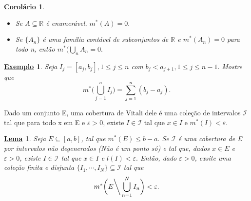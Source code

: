 \documentclass{article}
\newtheorem*{lemma*}{\underline{Lema}}
\newtheorem{example}{\underline{Exemplo}}
\newtheorem*{crl*}{\underline{Corol\'ario}}
\begin{document}
\begin{crl*}
 \begin{itemize}
   \item[1)] Se \(A\subseteq{\mathbb{R}}\) é enumerável, \(m^{*}(A) = 0.\)
     \item[2)] Se \(\{A_{n}\}\) é uma família contável de subconjuntos de \(\mathbb{R}\) e
       \(m^{*}(A_{n}) = 0\) para todo n, então \(m^{*}(\bigcup_{n}^{}A_{n} = 0.\)
 \end{itemize}
\end{crl*}
\begin{example}
  Seja \(I_{j} = [a_{j}, b_{j}], 1\leq j\leq n\) com \(b_{j} < a_{j+1}, 1\leq j\leq n-1.\) Mostre que 
    \[
      m^{*}\biggl(\bigcup_{j=1}^{n}{I_{j}}\biggr) = \sum\limits_{j=1}^{n}(b_{j}-a_{j}).
    \]
\end{example}
  Dado um conjunto E, uma cobertura de Vitali dele é uma cole\c cão de intervalos
  \(\mathcal{I}\) tal que para todo x em E e \(\varepsilon  > 0\), existe \(I\in \mathcal{I}\) tal que
  \(x\in I\) e \(m^{*}(I) < \varepsilon .\) 
\hypertarget{vitali_covering}{
\begin{lemma*}
  Seja \(E\subseteq{[a, b]}\), tal que \(m^{*}(E)\leq b-a.\) Se \(\mathcal{I}\)
  é uma cobertura de E por intervalos não degenerados (Não é um ponto só) e tal que, dados \(x\in E\) e
  \(\varepsilon >0\), existe \(I\in \mathcal{I}\) tal que \(x\in I\) e \(l(I) < \varepsilon .\)
  Então, dado \(\varepsilon  > 0\), exsite uma cole\c cão finita e disjunta \(\{I_{1}, \cdots, I_{N}\}\subseteq{\mathcal{I}}\)
  tal que 
    \[
      m^{*}\biggl(E\biggl\backslash\biggr. \bigcup_{n=1}^{N}{I_{n}}\biggr) < \varepsilon .
    \]
\end{lemma*}}
\end{document}
